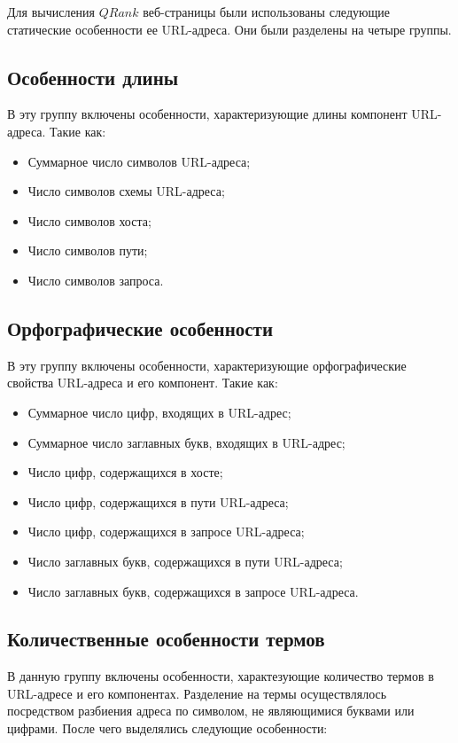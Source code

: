 Для вычисления $QRank$ веб-страницы были использованы следующие статические особенности ее URL-адреса. Они были разделены на четыре группы.

\subsection*{Особенности длины}

В эту группу включены особенности, характеризующие длины компонент URL-адреса. Такие как:

\begin{itemize}
\item Суммарное число символов URL-адреса;
\item Число символов схемы URL-адреса;
\item Число символов хоста;
\item Число символов пути;
\item Число символов запроса.
\end{itemize}

\subsection*{Орфографические особенности}

В эту группу включены особенности, характеризующие орфографические свойства URL-адреса и его компонент. Такие как:

\begin{itemize}
\item Суммарное число цифр, входящих в URL-адрес;
\item Суммарное число заглавных букв, входящих в URL-адрес;
\item Число цифр, содержащихся в хосте;
\item Число цифр, содержащихся в пути URL-адреса;
\item Число цифр, содержащихся в запросе URL-адреса;
\item Число заглавных букв, содержащихся в пути URL-адреса;
\item Число заглавных букв, содержащихся в запросе URL-адреса.
\end{itemize}

\subsection*{Количественные особенности термов}

В данную группу включены особенности, характезующие количество термов в URL-адресе и его компонентах. Разделение на термы осуществлялось посредством разбиения адреса по символом, не являющимися буквами или цифрами. После чего выделялись следующие особенности:

